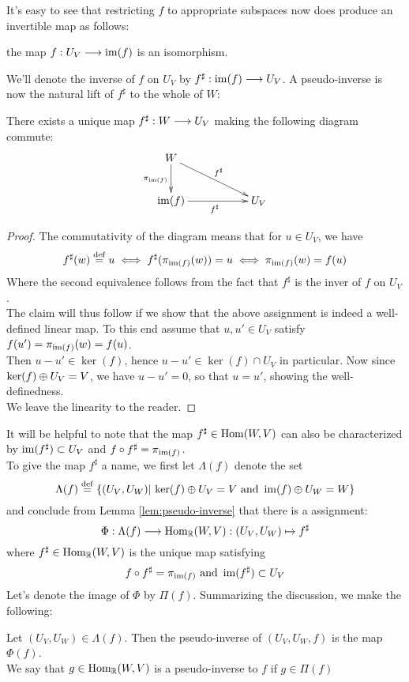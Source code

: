 It's easy to see that restricting $f$ to appropriate subspaces now does produce an invertible map as follows:

\begin{lemma}
	the map $f: U_V\longrightarrow \operatorname{im}(f)$ is an isomorphism.
\end{lemma}
\noindent We'll denote the inverse of $f$ on $U_V$ by $f^\sharp:\operatorname{im}(f)\longrightarrow U_V$. A pseudo-inverse is now the natural lift of $f^\sharp$ to the whole of $W$:


\begin{lemma}\label{lem:pseudo-inverse}
	There exists a unique map $f^\sharp:W\longrightarrow U_V$ making the following diagram commute:
	\begin{displaymath}
	\xymatrix{
	W\ar[d]_{\pi_{\im(f)}}\ar[drr]^{f^\sharp}\\
	\im(f)\ar[rr]_{f^\sharp} && U_V
	}
	\end{displaymath}
\end{lemma}

\begin{proof}
The commutativity of the diagram means that for $u \in U_V$, we have
\[
	f^\sharp(w) \stackrel{\operatorname{def}}{=} u\iff f^\sharp(\pi_{\operatorname{im}(f)}(w)) =u\iff \pi_{\operatorname{im}(f)}(w) =f(u)
\]
Where the second equivalence follows from the fact that $f^\sharp$ is the inver of $f$ on $U_V$.\\
The claim will thus follow if we show that the above assignment is indeed a well-defined linear map. To this end assume that $u,u' \in U_V$ satisfy $f(u')=\pi_{\operatorname{im}(f)}(w)=f(u)$.\\ Then $u-u' \in \ker(f)$, hence $u-u' \in \ker(f)\cap U_V$ in particular. Now since $\ker(f)\oplus U_V =V$, we have  $u-u'=0$, so that $u=u'$, showing the well-definedness.\\ 
We leave the linearity to the reader.
\end{proof}
It will be helpful to note that the map $f^\sharp\in \operatorname{Hom}(W,V)$ can also be characterized by $\operatorname{im}(f^\sharp)\subset U_V$ and $f\circ f^\sharp =\pi_{\operatorname{im}(f)}$.\\
To give the map $f^\sharp$ a name, we first let $\Lambda(f)$ denote the set
\[
\Lambda(f)\stackrel{\operatorname{def}}{=} \{(U_V,U_W)\vert \, \ker(f)\oplus U_V=V \textrm{ and } \operatorname{im}(f)\oplus U_W =W \}
\]
and conclude from Lemma \ref{lem:pseudo-inverse} that there is a assignment:
\[
\Phi: \Lambda(f)\longrightarrow \operatorname{Hom}_{\mathbb{R}}(W,V):(U_V,U_W)\mapsto f^\sharp
\]
where $f^\sharp \in \operatorname{Hom}_{\mathbb{R}}(W,V)$ is the unique map satisfying
\[
f \circ f^\sharp = \pi_{\operatorname{im}(f)} \textrm{ and } \operatorname{im}(f^\sharp)\subset U_V
\]
Let's denote the image of $\Phi$ by $\Pi(f)$. Summarizing the discussion, we make the following:
\begin{definition}\label{def:ps}
Let $(U_V,U_W) \in \Lambda(f)$. Then the pseudo-inverse of $(U_V,U_W,f)$ is the map $\Phi(f)$.\\
We say that $g\in \operatorname{Hom}_{\mathbb{R}}(W,V)$ is a pseudo-inverse to $f$ if $g\in \Pi(f)$
\end{definition}

